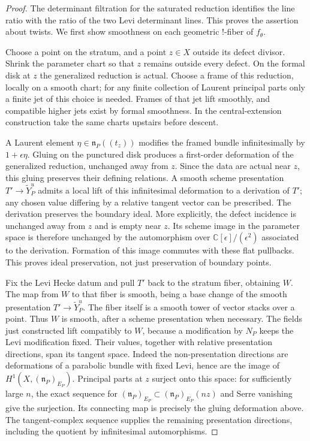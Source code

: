 \begin{proof}
The determinant filtration for the saturated reduction identifies the line
ratio with the ratio of the two Levi determinant lines.  This proves the
assertion about twists.  We first show smoothness on each geometric
!-fiber of $f_\theta$.

Choose a point on the stratum, and a point $z\in X$ outside its defect divisor.
Shrink the parameter chart so that $z$ remains outside every defect.  On the
formal disk at $z$ the generalized reduction is actual.  Choose a frame of
this reduction, locally on a smooth chart; for any finite collection of
Laurent principal parts only a finite jet of this choice is needed.  Frames
of that jet lift smoothly, and compatible higher jets exist by formal
smoothness.  In the central-extension construction take the same charts
upstairs before descent.

A Laurent element $\eta\in\mathfrak n_P((t_z))$ modifies the framed bundle
infinitesimally by $1+\epsilon\eta$.  Gluing on the punctured disk produces a
first-order deformation of the generalized reduction, unchanged away from
$z$.  Since the data are actual near $z$, this gluing preserves their defining
relations.  A smooth scheme presentation $T'\to\widetilde Y_P^u$ admits a
local lift of this infinitesimal deformation to a derivation of $T'$; any
chosen value differing by a relative tangent vector can be prescribed.
The derivation preserves the boundary ideal.  More explicitly, the defect
incidence is unchanged away from $z$ and is empty near $z$.  Its scheme image
in the parameter space is therefore unchanged by the automorphism over
$\mathbb C[\epsilon]/(\epsilon^2)$ associated to the derivation.  Formation
of this image commutes with these flat pullbacks.  This proves ideal
preservation, not just preservation of boundary points.

Fix the Levi Hecke datum and pull $T'$ back to the stratum fiber, obtaining
$W$.  The map from $W$ to that fiber is smooth, being a base change of the
smooth presentation $T'\to\widetilde Y_P^u$.  The fiber itself is a smooth
tower of vector stacks over a point.  Thus $W$ is smooth, after a scheme
presentation when necessary.
The fields just constructed lift compatibly to $W$, because a modification
by $N_P$ keeps the Levi modification fixed.  Their values, together with
relative presentation directions, span its tangent space.  Indeed the
non-presentation directions are deformations of a parabolic bundle with
fixed Levi, hence are the image of
$H^1(X,(\mathfrak n_P)_{E_P})$.  Principal parts at $z$ surject onto this
space: for sufficiently large $n$, the exact sequence for
$(\mathfrak n_P)_{E_P}\subset(\mathfrak n_P)_{E_P}(nz)$ and Serre vanishing
give the surjection.  Its connecting map is precisely the gluing deformation
above.  The tangent-complex sequence supplies the remaining presentation
directions, including the quotient by infinitesimal automorphisms.


\end{proof}
